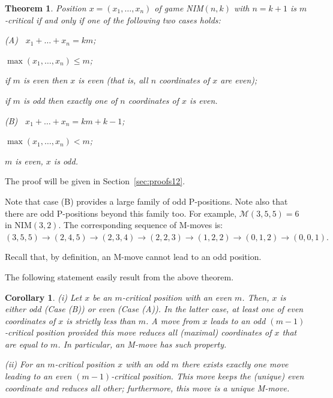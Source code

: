 \documentclass{article}
\newtheorem{theorem}{Theorem}
\newtheorem{corollary}{Corollary}
\theoremstyle{definition}
\def\M{\mathcal{M}}
\begin{document}
\begin{theorem}\label{th:critical}
Position $x = (x_1, \dots, x_n)$  
of game NIM$(n,k)$  with $n = k+1$  
is $m$-critical if and only if 
one of the following two cases holds: 

\bigskip 

\textup{(A)}  $\;\; x_1 + \dots + x_n = km$; 

\smallskip 

$\max(x_1, \dots, x_n) \leq m$;   

\smallskip 

if $m$ is even then  $x$  is even 
(that is, all $n$ coordinates of $x$  are even);  

\smallskip 

if $m$ is odd then exactly one of $n$ coordinates 
of  $x$  is even. 

\bigskip 

\textup{(B)} $\;\; x_1 + \dots + x_n = km + k - 1$;

\smallskip 

$\max(x_1, \dots, x_n) < m$;   

\smallskip 

$m$ is even, $x$ is odd. 
\end{theorem}

\medskip 

The proof will be given in Section~\ref{sec:proofs12}. 

\medskip 

Note that case (B)  provides a large family 
of odd P-positions. 
Note also that there are odd P-positions beyond 
this family too. 
For example, $\M(3,5,5) = 6$ in NIM$(3,2)$. 
The corresponding sequence of  M-moves is: 
$(3,5,5) \to (2,4,5) \to (2,3,4) \to (2,2,3) 
\to (1,2,2) \to (0,1,2) \to (0,0,1).$

\medskip 

Recall that, by definition, 
an M-move cannot lead to an odd position.  

\bigskip 

The following statement easily result   
from the above theorem.

\begin{corollary}
\label{cor1}
(i) Let  $x$ be an $m$-critical position with an even $m$. 
Then, $x$ is either odd \textup(Case \textup{(B)}\textup) or even \textup(Case \textup{(A)}\textup).    
In the latter case, at least one of even coordinates of  $x$ 
is strictly less than  $m$. 
A move from  $x$  leads 
to an odd $(m-1)$-critical position 
provided this move reduces 
all (maximal) coordinates of  $x$ 
that are equal to  $m$. 
In particular, an M-move has such property. 

\medskip

(ii) For an $m$-critical position $x$ with an odd $m$   
there exists exactly one move 
leading to an even $(m-1)$-critical position. 
This move keeps the (unique) even coordinate 
and reduces all other; 
furthermore, this move is a unique M-move. 
\end{corollary}
\end{document}
